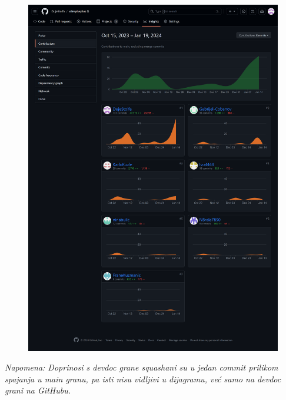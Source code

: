 		\begin{figure}[H]
			\includegraphics[scale=0.15]{slike/git.png}
			\centering
		\end{figure}

		\emph{Napomena: Doprinosi s devdoc grane squashani su u jedan commit prilikom spajanja u main granu, pa isti nisu vidljivi u dijagramu, već samo na devdoc grani na GitHubu.}
